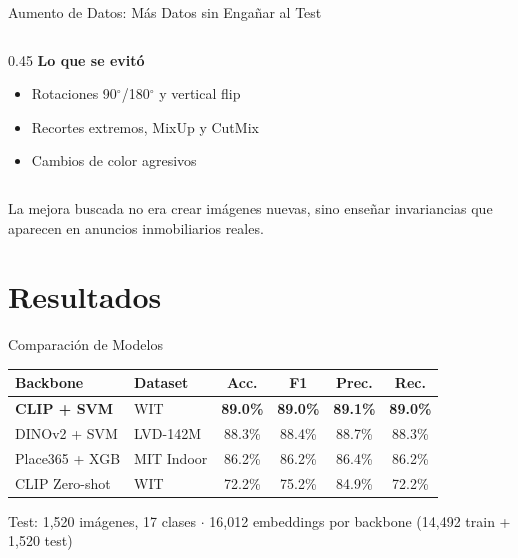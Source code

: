 \documentclass[aspectratio=169]{beamer}
\begin{document}
\begin{frame}{Aumento de Datos: M\'as Datos sin Enga\~nar al Test}
\begin{columns}[T,totalwidth=\textwidth]
\begin{column}{0.45\textwidth}
\vspace{0.12cm}
\textbf{Lo que se evit\'o}
\begin{itemize}
\item Rotaciones 90$^\circ$/180$^\circ$ y vertical flip
\item Recortes extremos, MixUp y CutMix
\item Cambios de color agresivos
\end{itemize}
\end{column}
\end{columns}

\vspace{0.12cm}
\centering
{\small La mejora buscada no era crear im\'agenes nuevas, sino ense\~nar invariancias que aparecen en anuncios inmobiliarios reales.}
\end{frame}

\section{Resultados}

\begin{frame}{Comparaci\'on de Modelos}
\begin{table}
\centering
\small
\begin{tabular}{@{}llcccc@{}}
\toprule
\textbf{Backbone} & \textbf{Dataset} & \textbf{Acc.} & \textbf{F1} & \textbf{Prec.} & \textbf{Rec.} \\
\midrule
\textbf{CLIP + SVM} & WIT & \textbf{89.0\%} & \textbf{89.0\%} & \textbf{89.1\%} & \textbf{89.0\%} \\
DINOv2 + SVM & LVD-142M & 88.3\% & 88.4\% & 88.7\% & 88.3\% \\
Place365 + XGB & MIT Indoor & 86.2\% & 86.2\% & 86.4\% & 86.2\% \\
\midrule
CLIP Zero-shot & WIT & 72.2\% & 75.2\% & 84.9\% & 72.2\% \\
\bottomrule
\end{tabular}
\vspace{0.12cm}

{\footnotesize Test: 1,520 im\'agenes, 17 clases $\cdot$ 16,012 embeddings por backbone (14,492 train + 1,520 test)}
\end{table}
\end{frame}
\end{document}
